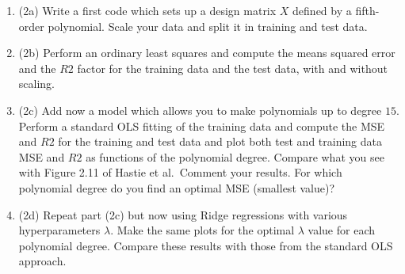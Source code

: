 \documentclass[%
oneside,                 %
final,                   %
10pt]{article}
\begin{document}
\begin{enumerate}
\item (2a) Write a first code which sets up a design matrix $X$ defined by a fifth-order polynomial.  Scale your data and split it in training and test data. 

\item (2b) Perform an ordinary least squares and compute the means squared error and the $R2$ factor for the training data and the test data, with and without scaling.

\item (2c) Add now a model which allows you to make polynomials up to degree $15$.  Perform a standard OLS fitting of the training data and compute the MSE and $R2$ for the training and test data and plot both test and training data MSE and $R2$ as functions of the polynomial degree. Compare what you see with Figure 2.11 of Hastie et al.~Comment your results. For which polynomial degree do you find an optimal MSE (smallest value)?

\item (2d) Repeat part (2c) but now using Ridge regressions with various hyperparameters $\lambda$. Make the same plots for the optimal $\lambda$ value for each polynomial degree. Compare these results with those from the standard OLS approach.
\end{enumerate}

\noindent

\end{document}
